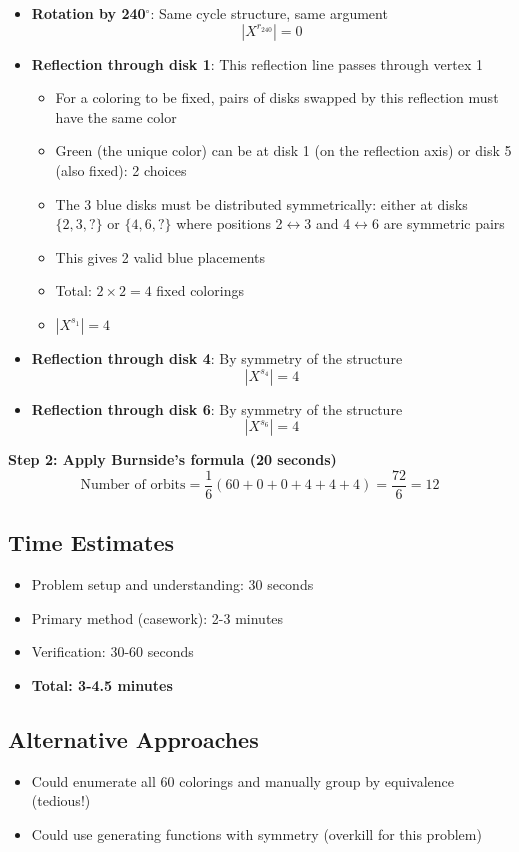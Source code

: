 \documentclass[11pt]{article}
\begin{document}
\begin{solutionbox}
\begin{itemize}
    \item \textbf{Rotation by 240$^\circ$}: Same cycle structure, same argument
    \[|X^{r_{240}}| = 0\]
    
    \item \textbf{Reflection through disk 1}: This reflection line passes through vertex 1
    \begin{itemize}
        \item For a coloring to be fixed, pairs of disks swapped by this reflection must have the same color
        \item Green (the unique color) can be at disk 1 (on the reflection axis) or disk 5 (also fixed): 2 choices
        \item The 3 blue disks must be distributed symmetrically: either at disks $\{2,3,?\}$ or $\{4,6,?\}$ where positions 2$\leftrightarrow$3 and 4$\leftrightarrow$6 are symmetric pairs
        \item This gives 2 valid blue placements
        \item Total: $2 \times 2 = 4$ fixed colorings
        \item $|X^{s_1}| = 4$
    \end{itemize}
    
    \item \textbf{Reflection through disk 4}: By symmetry of the structure
    \[|X^{s_4}| = 4\]
    
    \item \textbf{Reflection through disk 6}: By symmetry of the structure
    \[|X^{s_6}| = 4\]
\end{itemize}

\textbf{Step 2: Apply Burnside's formula (20 seconds)}
\[
\text{Number of orbits} = \frac{1}{6}(60 + 0 + 0 + 4 + 4 + 4) = \frac{72}{6} = 12
\]

\subsection*{Time Estimates}
\begin{itemize}
    \item Problem setup and understanding: 30 seconds
    \item Primary method (casework): 2-3 minutes
    \item Verification: 30-60 seconds
    \item \textbf{Total: 3-4.5 minutes}
\end{itemize}

\subsection*{Alternative Approaches}
\begin{itemize}
    \item Could enumerate all 60 colorings and manually group by equivalence (tedious!)
    \item Could use generating functions with symmetry (overkill for this problem)
\end{itemize}


\end{solutionbox}
\end{document}
